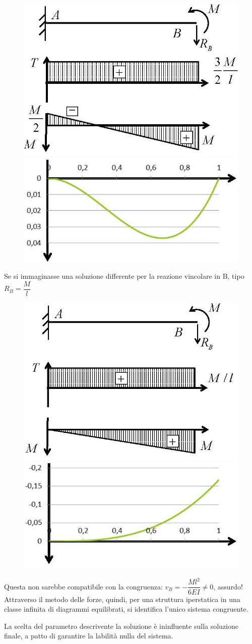 \documentclass{article}
\begin{document}
\begin{adjustwidth}{2in}{}
\begin{figure}[H]
	\centering
	\includegraphics[width=0.4\linewidth]{"immagini/1.PARTE8_Pagina_43 (2)"}
	\includegraphics[width=0.4\linewidth]{"immagini/1.PARTE8_Pagina_43"}
\end{figure} 

		Se si immaginasse una soluzione differente per la reazione vincolare in B, tipo $R_B = \dfrac{M}{l}$
		
\begin{figure}[H]
	\centering
	\includegraphics[width=0.4\linewidth]{"immagini/1.PARTE8_Pagina_44 (2)"}
	\includegraphics[width=0.4\linewidth]{"immagini/1.PARTE8_Pagina_44"}
\end{figure}

		Questa non sarebbe compatibile con la congruenza: $v_B = -\dfrac{Ml^2}{6EI} \ne 0$, assurdo! \newline 
\newpage		
		Attraverso il metodo delle forze, quindi, per una struttura iperstatica in una classe infinita di diagrammi
		equilibrati, si identifica l’unico sistema congruente.
		
		La scelta del parametro descrivente la soluzione è ininfluente sulla soluzione finale, a patto di
		garantire la labilità nulla del sistema.
		

\end{adjustwidth}
\end{document}
